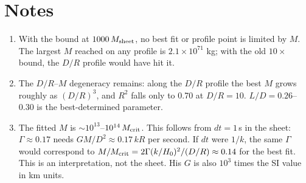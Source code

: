 \documentclass[10pt]{article}
\begin{document}
\section{Notes}
\begin{enumerate}\setlength{\itemsep}{1pt}
\item With the bound at $1000\,M_{\rm sheet}$, no best fit or profile point is limited by $M$. The largest $M$ reached on any profile is $2.1\times10^{71}$ kg; with the old $10\times$ bound, the $D/R$ profile would have hit it.
\item The $D/R$--$M$ degeneracy remains: along the $D/R$ profile the best $M$ grows roughly as $(D/R)^3$, and $R^2$ falls only to 0.70 at $D/R=10$. $L/D=0.26$--$0.30$ is the best-determined parameter.
\item The fitted $M$ is $\sim10^{13}$--$10^{14}\,M_{\rm crit}$. This follows from $dt=1$\,s in the sheet: $\Gamma\approx0.17$ needs $GM/D^2\approx0.17\,kR$ per second. If $dt$ were $1/k$, the same $\Gamma$ would correspond to $M/M_{\rm crit}=2\Gamma(k/H_0)^2/(D/R)\approx0.14$ for the best fit. This is an interpretation, not the sheet. His $G$ is also $10^3$ times the SI value in km units.
\end{enumerate}
\end{document}
